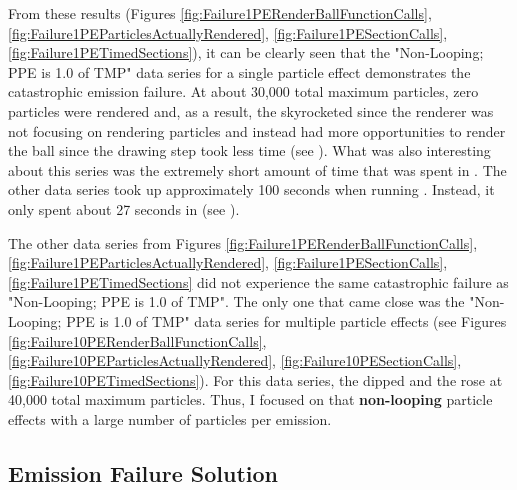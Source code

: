 From these results (Figures \ref{fig:Failure1PERenderBallFunctionCalls}, \ref{fig:Failure1PEParticlesActuallyRendered}, \ref{fig:Failure1PESectionCalls}, \ref{fig:Failure1PETimedSections}), it can be clearly seen that the "Non-Looping; PPE is 1.0 of TMP" data series for a single particle effect demonstrates the catastrophic emission failure. At about 30,000 total maximum particles, zero particles were rendered and, as a result, the  skyrocketed since the renderer was not focusing on rendering particles and instead had more opportunities to render the ball since the drawing step took less time (see ). What was also interesting about this series was the extremely short amount of time that was spent in . The other data series took up approximately 100 seconds when running . Instead, it only spent about 27 seconds in  (see ). 

The other data series from Figures \ref{fig:Failure1PERenderBallFunctionCalls}, \ref{fig:Failure1PEParticlesActuallyRendered}, \ref{fig:Failure1PESectionCalls}, \ref{fig:Failure1PETimedSections} did not experience the same catastrophic failure as "Non-Looping; PPE is 1.0 of TMP". The only one that came close was the "Non-Looping; PPE is 1.0 of TMP" data series for multiple particle effects (see Figures \ref{fig:Failure10PERenderBallFunctionCalls}, \ref{fig:Failure10PEParticlesActuallyRendered}, \ref{fig:Failure10PESectionCalls}, \ref{fig:Failure10PETimedSections}). For this data series, the  dipped and the  rose at 40,000 total maximum particles. Thus, I focused on that \textbf{non-looping} particle effects with a large number of particles per emission. 


\subsection{Emission Failure Solution}\label{ssec:observe_emit_failure_solution}

